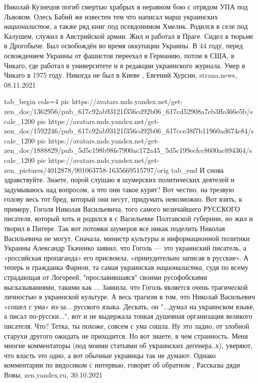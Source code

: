 Николай Кузнецов погиб смертью храбрых в неравном бою с отрядом УПА под
Львовом.  Олесь Бабий же известен тем что написал марш украинских
\emph{националистов}, а также ряд книг под псевдонимом Хмелик. Родился в селе под
Калушем, служил в Австрийской армии. Жил и работал в Праге. Сидел в тюрьме в
Дрогобыче. Был освобождён во время оккупации Украины. В 44 году, перед
освождением Украины от фашистов переехал в Германию, потом в США, в Чикаго, где
работал в университете и в редакции украинского журнала. Умер в Чикаго в 1975
году. Никогда не был в Киеве
, 
Евгений Хурсин, strana.news, 08.11.2021

\ifcmt
  tab_begin cols=4
     pic https://avatars.mds.yandex.net/get-zen_doc/1362956/pub_617c92ab93121f356cd92b06_617cd52908a7eb3ffe366e5b/scale_1200
     pic https://avatars.mds.yandex.net/get-zen_doc/1592246/pub_617c92ab93121f356cd92b06_617cce38f7b11960ad674e84/scale_1200
     pic https://avatars.mds.yandex.net/get-zen_doc/1888829/pub_5d5c198b98fe7900ac172a45_5d5c199ecfcc8600ac894364/scale_1200
     pic https://avatars.mds.yandex.net/get-zen_pictures/4012878/901063758-1635669515797/orig
  tab_end
\fi
И снова здравствуйте. Знаете, порой слушаю я шумерских политических деятелей и
задумываюсь над вопросом, а что они такое курят? Вот честно, на трезвую голову
весь тот бред, который они несут, придумать невозможно.  Вот взять, к примеру,
Гоголя Николая Васильевича, того самого величайшего РУССКОГО писателя, который
хоть и родился в с Васильевке Полтавской губернии, но жил и творил в Питере.
Так вот потомки шумеров все никак поделить Николая Васильевича не могут.
Сначала, министр культуры и информационной политики Украины Александр Ткаченко
заявил, что Гоголь — это украинский писатель, а «российская пропаганда» его
присвоила, «принудительно записав в русские».  А теперь и гражданка Фарион, та
самая украинская \emph{националистка}, судя по всему страдающая от Логореей,
"прославившаяся" своими русофобскими высказываниями, такими как ...  Заявила,
что Гоголь является очень трагической личностью в украинской культуре.  А весь
трагизм в том, что Николай Васильевич «сошел с ума» из-за... русского языка.
Дескать, он "...думал на украинском языке, а писал по-русски...", вот и не
выдержала тонкая душевная организация великого писателя. Что? Тетка, ты похоже,
совсем с ума сошла.  Ну это ладно, от злобной старухи другого ожидать не
приходится. Но вот знаете, в чем странность. Меня многие комментаторы (под
моими статьями об украинских дегенера..х), уверяют, что власть это одно, а вот
обычные украинцы так не думают. Однако комментарии по видосиком с интервью,
говорят об обратном
, 
Рассказы дяди Вовы, zen.yandex.ru, 30.10.2021
